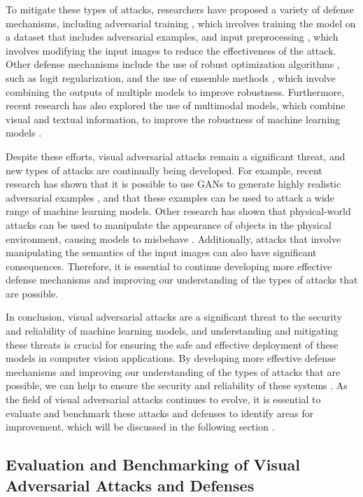 \documentclass[11pt]{article}
\begin{document}
To mitigate these types of attacks, researchers have proposed a variety of defense mechanisms, including adversarial training \cite{ref8}, which involves training the model on a dataset that includes adversarial examples, and input preprocessing \cite{ref8}, which involves modifying the input images to reduce the effectiveness of the attack. Other defense mechanisms include the use of robust optimization algorithms \cite{ref14}, such as logit regularization, and the use of ensemble methods \cite{ref24}, which involve combining the outputs of multiple models to improve robustness. Furthermore, recent research has also explored the use of multimodal models, which combine visual and textual information, to improve the robustness of machine learning models \cite{ref25}.

Despite these efforts, visual adversarial attacks remain a significant threat, and new types of attacks are continually being developed. For example, recent research has shown that it is possible to use GANs to generate highly realistic adversarial examples \cite{ref23}, and that these examples can be used to attack a wide range of machine learning models. Other research has shown that physical-world attacks can be used to manipulate the appearance of objects in the physical environment, causing models to misbehave \cite{ref7}. Additionally, attacks that involve manipulating the semantics of the input images \cite{ref26} can also have significant consequences. Therefore, it is essential to continue developing more effective defense mechanisms and improving our understanding of the types of attacks that are possible.

In conclusion, visual adversarial attacks are a significant threat to the security and reliability of machine learning models, and understanding and mitigating these threats is crucial for ensuring the safe and effective deployment of these models in computer vision applications. By developing more effective defense mechanisms and improving our understanding of the types of attacks that are possible, we can help to ensure the security and reliability of these systems \cite{ref8}. As the field of visual adversarial attacks continues to evolve, it is essential to evaluate and benchmark these attacks and defenses to identify areas for improvement, which will be discussed in the following section \cite{ref8}.

\subsection{Evaluation and Benchmarking of Visual Adversarial Attacks and Defenses}
\end{document}
